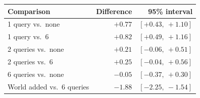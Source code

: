 \begin{tabular}{@{}lrr@{}}
\toprule
Comparison & Difference & 95\% interval \\
\midrule
1 query vs.\ none & $+0.77$ & $[+0.43,\ +1.10]$ \\
1 query vs.\ 6 & $+0.82$ & $[+0.49,\ +1.16]$ \\
2 queries vs.\ none & $+0.21$ & $[-0.06,\ +0.51]$ \\
2 queries vs.\ 6 & $+0.25$ & $[-0.04,\ +0.56]$ \\
\midrule
6 queries vs.\ none & $-0.05$ & $[-0.37,\ +0.30]$ \\
World added vs.\ 6 queries & $-1.88$ & $[-2.25,\ -1.54]$ \\
\bottomrule
\end{tabular}
